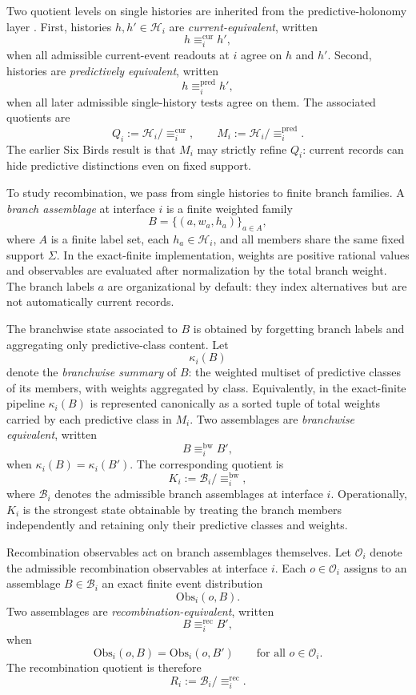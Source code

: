 \documentclass[11pt]{article}
\theoremstyle{definition}
\begin{document}
Two quotient levels on single histories are inherited from the predictive-holonomy layer \cite{Tsiokos2026RouteTransport}.
First, histories \(h,h' \in \mathcal H_i\) are \emph{current-equivalent}, written
\[
h \equiv_i^{\mathrm{cur}} h',
\]
when all admissible current-event readouts at \(i\) agree on \(h\) and \(h'\). Second, histories are \emph{predictively equivalent}, written
\[
h \equiv_i^{\mathrm{pred}} h',
\]
when all later admissible single-history tests agree on them. The associated quotients are
\[
Q_i := \mathcal H_i / {\equiv_i^{\mathrm{cur}}},
\qquad
M_i := \mathcal H_i / {\equiv_i^{\mathrm{pred}}}.
\]
The earlier Six Birds result is that \(M_i\) may strictly refine \(Q_i\): current records can hide predictive distinctions even on fixed support.

To study recombination, we pass from single histories to finite branch families. A \emph{branch assemblage} at interface \(i\) is a finite weighted family
\[
B=\{(a,w_a,h_a)\}_{a\in A},
\]
where \(A\) is a finite label set, each \(h_a \in \mathcal H_i\), and all members share the same fixed support \(\Sigma\). In the exact-finite implementation, weights are positive rational values and observables are evaluated after normalization by the total branch weight. The branch labels \(a\) are organizational by default: they index alternatives but are not automatically current records.

The branchwise state associated to \(B\) is obtained by forgetting branch labels and aggregating only predictive-class content. Let
\[
\kappa_i(B)
\]
denote the \emph{branchwise summary} of \(B\): the weighted multiset of predictive classes of its members, with weights aggregated by class. Equivalently, in the exact-finite pipeline \(\kappa_i(B)\) is represented canonically as a sorted tuple of total weights carried by each predictive class in \(M_i\). Two assemblages are \emph{branchwise equivalent}, written
\[
B \equiv_i^{\mathrm{bw}} B',
\]
when \(\kappa_i(B)=\kappa_i(B')\). The corresponding quotient is
\[
K_i := \mathcal B_i / {\equiv_i^{\mathrm{bw}}},
\]
where \(\mathcal B_i\) denotes the admissible branch assemblages at interface \(i\). Operationally, \(K_i\) is the strongest state obtainable by treating the branch members independently and retaining only their predictive classes and weights.

Recombination observables act on branch assemblages themselves. Let \(\mathcal O_i\) denote the admissible recombination observables at interface \(i\). Each \(o \in \mathcal O_i\) assigns to an assemblage \(B \in \mathcal B_i\) an exact finite event distribution
\[
\mathrm{Obs}_i(o,B).
\]
Two assemblages are \emph{recombination-equivalent}, written
\[
B \equiv_i^{\mathrm{rec}} B',
\]
when
\[
\mathrm{Obs}_i(o,B)=\mathrm{Obs}_i(o,B')
\qquad
\text{for all } o \in \mathcal O_i.
\]
The recombination quotient is therefore
\[
R_i := \mathcal B_i / {\equiv_i^{\mathrm{rec}}}.
\]
\end{document}
